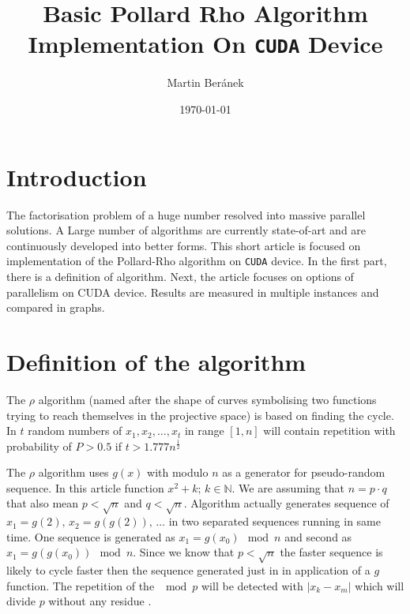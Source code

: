 \documentclass[a4paper]{article}
\begin{document}
\title{Basic Pollard Rho Algorithm Implementation On \texttt{CUDA} Device}
\author{Martin Beránek}
\date{\today}
\maketitle

\tableofcontents
\listoffigures
\newpage

\section{Introduction}

The factorisation problem of a huge number resolved into massive parallel solutions. A Large number of algorithms are currently state-of-art and are continuously developed into better forms. This short article is focused on implementation of the Pollard-Rho algorithm on \texttt{CUDA} device. In the first part, there is a definition of algorithm. Next, the article focuses on options of parallelism on CUDA device. Results are measured in multiple instances and compared in graphs. 

\section{Definition of the algorithm}

The $\rho$ algorithm (named after the shape of curves symbolising two functions trying to reach themselves in the projective space) is based on finding the cycle. In $t$ random numbers of $x_1, x_2, \dots, x_t$ in range $[1, n]$ will contain repetition with probability of $P > 0.5$ if $t > 1.777n^{\frac{1}{2}}$

The $\rho$ algorithm uses $g(x)$ with modulo $n$ as a generator for pseudo-random sequence. In this article function $x^2 + k;\, k \in \mathbb{N}$. We are assuming that $n = p \cdot q$ that also mean $p < \sqrt{n}$ and $q < \sqrt{n}$. Algorithm actually generates sequence of $x_1 = g(2),\,x_2 = g(g(2)),\,\dots$ in two separated sequences running in same time. One sequence is generated as $x_1=g(x_0) \mod n$ and second as $x_1=g(g(x_0)) \mod n$. Since we know that $p < \sqrt{n}$ the faster sequence is likely to cycle faster then the sequence generated just in in application of a $g$ function. The repetition of the $\mod p$ will be detected with $| x_k - x_m |$ which will divide $p$ without any residue \cite{wiki}.
\end{document}
